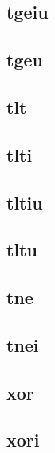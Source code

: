 \documentclass{article}
\begin{document}
\subsection*{tgeiu}

\subsection*{tgeu}

\subsection*{tlt}

\subsection*{tlti}

\subsection*{tltiu}

\subsection*{tltu}

\subsection*{tne}

\subsection*{tnei}

\subsection*{xor}

\subsection*{xori}
\end{document}
